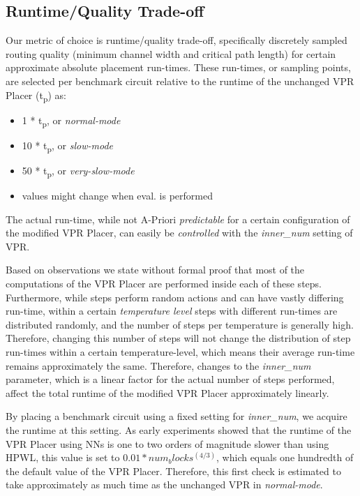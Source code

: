 \subsection{Runtime/Quality Trade-off}

Our metric of choice is runtime/quality trade-off, specifically discretely sampled routing quality (minimum channel width and critical path length) for certain approximate absolute placement run-times. These run-times, or sampling points, are selected per benchmark circuit relative to the runtime of the unchanged \gls{VPR} Placer (t\textsubscript{p}) as:

\begin{itemize}
	\item 1   * t\textsubscript{p}, or \textit{normal-mode}
	\item 10  * t\textsubscript{p}, or \textit{slow-mode}
	\item 50  * t\textsubscript{p}, or \textit{very-slow-mode}
	\item \cite{TODO} values might change when eval. is performed
\end{itemize}

The actual run-time, while not A-Priori \textit{predictable} for a certain configuration of the modified \gls{VPR} Placer, can easily be \textit{controlled} with the \textit{inner\_num} setting of \gls{VPR}.\cite{vtr8} 

Based on observations we state without formal proof that most of the computations of the \gls{VPR} Placer are performed inside each of these steps. Furthermore, while steps perform random actions and can have vastly differing run-time, within a certain \textit{temperature level} steps with different run-times are distributed randomly, and the number of steps per temperature is generally high. Therefore, changing this number of steps will not change the distribution of step run-times within a certain temperature-level, which means their average run-time remains approximately the same. Therefore, changes to the \textit{inner\_num} parameter, which is a linear factor for the actual number of steps performed, affect the total runtime of the modified \gls{VPR} Placer approximately linearly.

By placing a benchmark circuit using a fixed setting for \textit{inner\_num}, we acquire the runtime at this setting. As early experiments showed that the runtime of the \gls{VPR} Placer using \glspl{NN} is one to two orders of magnitude slower than using \gls{HPWL}, this value is set to $0.01*num_blocks^(4/3)$, which equals one hundredth of the default value of the \gls{VPR} Placer. Therefore, this first check is estimated to take approximately as much time as the unchanged \gls{VPR} in \textit{normal-mode}.

